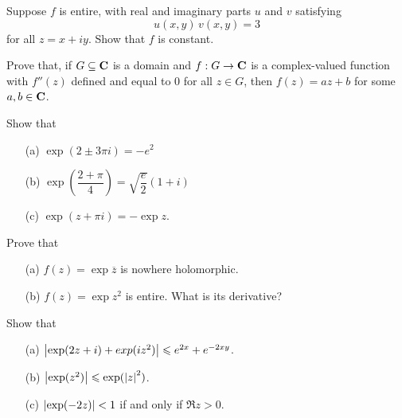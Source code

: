 \vspace{0.1in}

\begin{problem}\label{prob 8.3}
Suppose $f$ is entire, with real and imaginary parts $u$ and $v$ satisfying
\[u(x, y)\, v(x, y) = 3\]
for all $z = x + i y$. Show that $f$ is constant.
\end{problem}

\vspace{0.1in}

\begin{problem}\label{prob 8.4}
Prove that, if $G \subseteq \mathbf C$ is a domain and $f : G \to \mathbf C$ is a complex-valued function with $f''(z)$ defined and equal to $0$ for all $z \in G$, then $f(z) = az + b$ for some $a, b \in \mathbf C$. 
\end{problem}

\vspace{0.1in}

\begin{problem}\label{prob 8.5}
Show that
\begin{itemize}
\item[(a)] $\exp(2 \pm 3\pi i) = -e^2$
\item[(b)] $\exp\left(\dfrac{2 + \pi}{4}\right) = \sqrt{\dfrac{e}{2}}(1 + i)$
\item[(c)] $\exp(z + \pi i) = -\exp z$.
\end{itemize}
\end{problem}

\vspace{0.1in}

\begin{problem}\label{prob 8.6}
Prove that
\begin{itemize}
\item[(a)] $f(z) = \exp\overline{z}$ is nowhere holomorphic.
\item[(b)] $f(z) = \exp z^2$ is entire. What is its derivative?
\end{itemize}
\end{problem}

\vspace{0.1in}

\begin{problem}\label{prob 8.7}
Show that
\begin{itemize}
\item[(a)] $\left\lvert\exp(2z + i) + exp(iz^2)\right\rvert \leqslant e^{2x} + e^{-2xy}$.
\item[(b)] $\left\lvert\exp(z^2)\right\rvert \leqslant \exp(\left\lvert z\right\rvert^2)$.
\item[(c)] $\left\lvert\exp(-2z)\right\rvert < 1$ if and only if $\Re z > 0$.
\end{itemize}
\end{problem}

